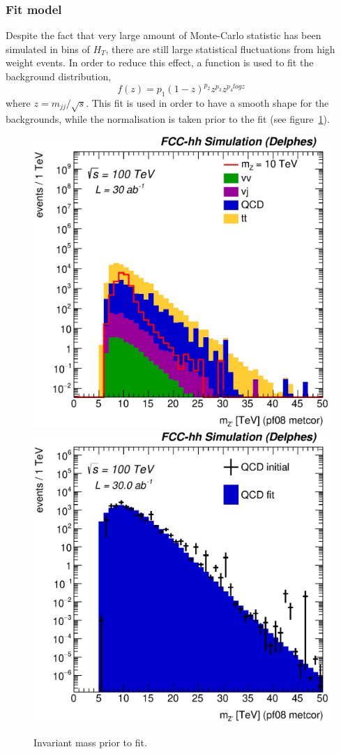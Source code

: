 \documentclass{cernrep}
\newcommand*{\hht}{\ensuremath{H_{\ensuremath{T}}}}
\begin{document}
\subsubsection{Fit model}
Despite the fact that very large amount of Monte-Carlo statistic has been simulated in bins of $\hht$, there are still large statistical fluctuations from high weight events.
In order to reduce this effect, a function is used to fit the background distribution,
\begin{equation}
f(z)=p_1(1-z)^{p_2}z^{p_3}z^{p_{4}logz}
\end{equation}
where $z=m_{jj}/\sqrt{s}$. This fit is used in order to have a smooth shape for the backgrounds, while the normalisation is taken prior to the fit (see figure~\ref{fig:hadronicresonances_nofit}).

\begin{figure}[!htb]\centering
\includegraphics[width=0.45\columnwidth]{Fig/Zptt/Mj1j2_pf08_MetCorr_sel8_nostack_log.eps}
\includegraphics[width=0.45\columnwidth]{Fig/Zptt/Zptt_QCD_sel8_Mj1j2_pf08_MetCorr_fit.eps}
\caption{Invariant mass prior to fit.}
\label{fig:hadronicresonances_nofit}
\end{figure}
\end{document}
